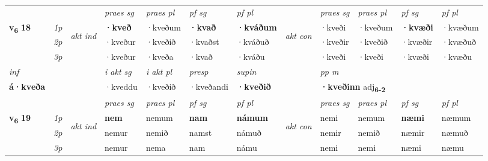 \begin{longtable}[l]{X>{\footnotesize\itshape}llXXXXlXXXX}
\midrule

 & &   & \textit{praes sg}  & \textit{praes pl}    & \textit{ pf sg} & \textit{pf pl} & & \textit{praes sg}  & \textit{praes pl}    & \textit{pf sg} & \textit{pf pl }  \\ \cmidrule{4-7} \cmidrule{9-12}
 \multirow{2}{*}{{{\textbf{v{\textsubscript{6}}} \Large{\textbf{18}}}}}  & 1p & \multirow{3}{*}{\begin{turn}{90}\textit{akt ind}\end{turn}} & \textbf{·kveð} & ·kveðum & \textbf{·kvað} & \textbf{·kváðum} & \multirow{3}{*}{\begin{turn}{90}\textit{akt con}\end{turn}} &·kveði & ·kveðum & \textbf{·kvæði} & ·kvæðum\\*
 & 2p &  &  ·kveður  & ·kveðið & ·kvaðst & ·kváðuð & & ·kveðir & ·kveðið & ·kvæðir & ·kvæðuð \\*
 & 3p &  & ·kveður & ·kveða & ·kvað & ·kváðu & & ·kveði & ·kveði& ·kvæði & ·kvæðu \\*
\cmidrule{4-7} \cmidrule{9-12}

   {\textit{inf}} & &  & \textit{i akt sg} & \textit{i akt pl}   & \textit{presp} & \textit{supin}  && \textit{pp m} \\*
  {\textbf{á\allowbreak ·kveða}} & && ·kveddu  & ·kveðið   & ·kveðandi &  \textbf{·kveðið}  && \multicolumn{2}{l}{\textbf{·kveðinn} adj\textbf{\textsubscript{6-2}}} \\*

\midrule

 & &   & \textit{praes sg}  & \textit{praes pl}    & \textit{ pf sg} & \textit{pf pl} & & \textit{praes sg}  & \textit{praes pl}    & \textit{pf sg} & \textit{pf pl }  \\ \cmidrule{4-7} \cmidrule{9-12}
 \multirow{2}{*}{{{\textbf{v{\textsubscript{6}}} \Large{\textbf{19}}}}}  & 1p & \multirow{3}{*}{\begin{turn}{90}\textit{akt ind}\end{turn}} & \textbf{nem} & nemum & \textbf{nam} & \textbf{námum} & \multirow{3}{*}{\begin{turn}{90}\textit{akt con}\end{turn}} &nemi & nemum & \textbf{næmi} & næmum\\*
 & 2p &  &  nemur  & nemið & namst & námuð & & nemir & nemið & næmir & næmuð \\*
 & 3p &  & nemur & nema & nam & námu & & nemi & nemi& næmi & næmu \\*
\cmidrule{4-7} \cmidrule{9-12}


\end{longtable}
